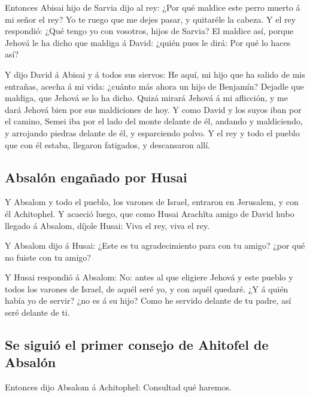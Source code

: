  Entonces Abisai hijo de Sarvia dijo al rey: ¿Por qué
maldice este perro muerto á mi señor el rey? Yo te ruego que me dejes
pasar, y quitaréle la cabeza.  Y el rey respondió: ¿Qué
tengo yo con vosotros, hijos de Sarvia? El maldice así, porque Jehová le
ha dicho que maldiga á David: ¿quién pues le dirá: Por qué lo haces así?

 Y dijo David á Abisai y á todos sus siervos: He aquí, mi
hijo que ha salido de mis entrañas, acecha á mi vida: ¿cuánto más ahora
un hijo de Benjamín? Dejadle que maldiga, que Jehová se lo ha dicho.
 Quizá mirará Jehová á mi aflicción, y me dará Jehová
bien por sus maldiciones de hoy.  Y como David y los
suyos iban por el camino, Semei iba por el lado del monte delante de él,
andando y maldiciendo, y arrojando piedras delante de él, y esparciendo
polvo.  Y el rey y todo el pueblo que con él estaba,
llegaron fatigados, y descansaron allí.

\hypertarget{absaluxf3n-engauxf1ado-por-husai}{%
\subsection{Absalón engañado por
Husai}\label{absaluxf3n-engauxf1ado-por-husai}}

 Y Absalom y todo el pueblo, los varones de Israel,
entraron en Jerusalem, y con él Achitophel.  Y acaeció
luego, que como Husai Arachîta amigo de David hubo llegado á Absalom,
díjole Husai: Viva el rey, viva el rey.

 Y Absalom dijo á Husai: ¿Este es tu agradecimiento para
con tu amigo? ¿por qué no fuiste con tu amigo?

 Y Husai respondió á Absalom: No: antes al que eligiere
Jehová y este pueblo y todos los varones de Israel, de aquél seré yo, y
con aquél quedaré.  ¿Y á quién había yo de servir? ¿no es
á su hijo? Como he servido delante de tu padre, así seré delante de ti.

\hypertarget{se-siguiuxf3-el-primer-consejo-de-ahitofel-de-absaluxf3n}{%
\subsection{Se siguió el primer consejo de Ahitofel de
Absalón}\label{se-siguiuxf3-el-primer-consejo-de-ahitofel-de-absaluxf3n}}

 Entonces dijo Absalom á Achitophel: Consultad qué
haremos.

